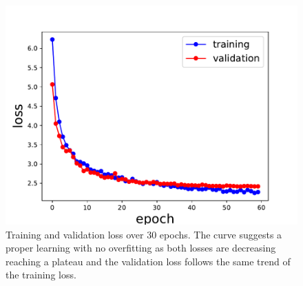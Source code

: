 \begin{figure}[H]
    \centering
    \includegraphics[width=.8\textwidth]{figures/Phasing/loss_low_strain_noiseless_doubleMSE_nosymm.pdf}
    \caption{Training and validation loss over 30 epochs. The curve suggests a proper learning with no overfitting as 
    both losses are decreasing reaching a plateau and the validation loss follows the same trend of the training loss.}
    \label{fig:loss_2mse_nosymm}
\end{figure}


